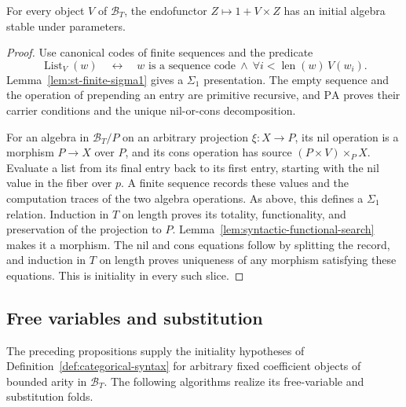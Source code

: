 \begin{proposition}
\label{prop:st-list-initiality}
For every object $V$ of $\mathcal B_T$, the endofunctor
$Z\mapsto1+V\times Z$ has an initial algebra stable under
parameters.
\end{proposition}
\begin{proof}
Use canonical codes of finite sequences and the predicate
\[
 \operatorname{List}_V(w)\quad\longleftrightarrow\quad
 w\text{ is a sequence code}\ \land\
       \forall i<\operatorname{len}(w)\,V(w_i).
\]
Lemma~\ref{lem:st-finite-sigma1} gives a $\Sigma_1$ presentation.
The empty sequence and the operation of prepending an entry are
primitive recursive, and $\mathrm{PA}$ proves their carrier
conditions and the unique nil-or-cons decomposition.

For an algebra in $\mathcal B_T/P$ on an arbitrary projection
$\xi:X\to P$, its nil operation is a morphism $P\to X$ over
$P$, and its cons operation has source
$(P\times V)\times_P X$. Evaluate a list from its final entry
back to its first entry, starting with the nil value in the fiber
over $p$. A finite sequence records these values and the
computation traces of the two algebra operations. As above, this
defines a $\Sigma_1$ relation. Induction in $T$ on length proves
its totality, functionality, and preservation of the projection to
$P$. Lemma~\ref{lem:syntactic-functional-search} makes it a morphism.
The nil and cons equations follow by splitting the record,
and induction in $T$ on length proves uniqueness of any morphism
satisfying these equations. This is initiality in every such slice.
\end{proof}

\subsection{Free variables and substitution}
\label{sec:st-substitution-realization}

The preceding propositions supply the initiality hypotheses of
Definition~\ref{def:categorical-syntax} for arbitrary fixed coefficient objects of bounded
arity in $\mathcal B_T$. The following algorithms realize its free-variable and substitution folds.

